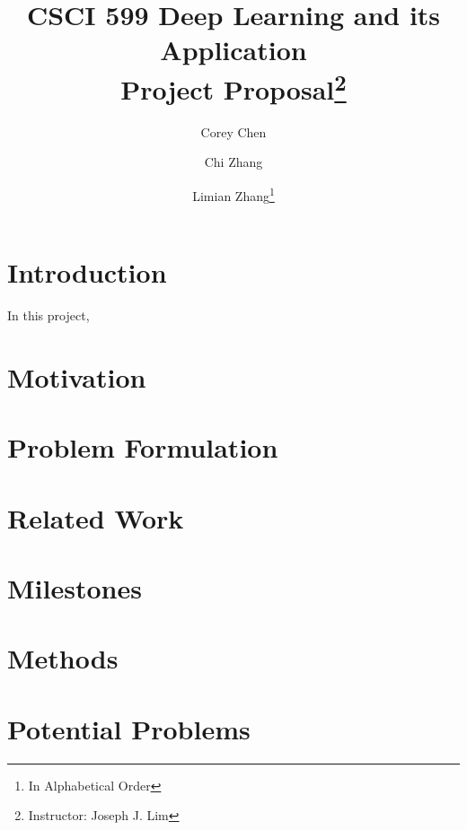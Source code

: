 \documentclass[a4paper, 11pt]{article}
\title{CSCI 599 Deep Learning and its Application\\Project Proposal\thanks{Instructor: Joseph J. Lim}}
\author[]{Corey Chen}
\author[]{Chi Zhang}
\author[]{Limian Zhang\footnote{In Alphabetical Order}}
\affil[]{Department of Computer Science}
\begin{document}
  \maketitle                     %
  \begin{spacing}{1.5}
    
    \section{Introduction}
    In this project, 
    
    \section{Motivation}
    
    \section{Problem Formulation}
    
    \section{Related Work}
    
    \section{Milestones}
    
    \section{Methods}
    
    \section{Potential Problems} 
  
  \end{spacing}  
  
  
\end{document}
